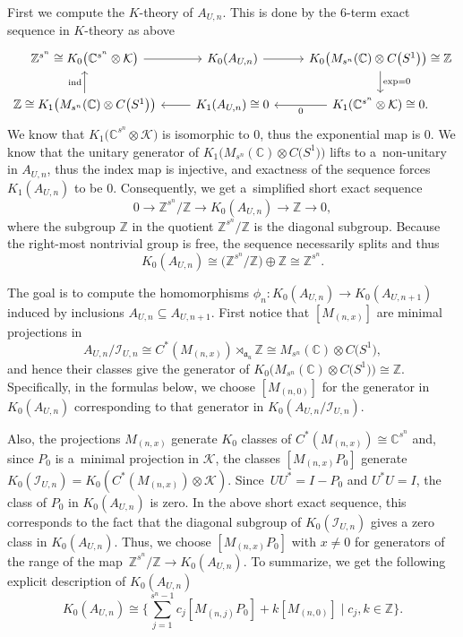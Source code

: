 \documentclass[10pt,a4paper]{amsart}
\newcommand{\C}{{\mathbb C}}
\newcommand{\Z}{{\mathbb Z}}
\newcommand{\kcal}{{\mathcal K}}
\newcommand{\fancyI}{\mathcal{I}}
\numberwithin{equation}{section}
\begin{document}
First we compute the $K$-theory of $A_{U,n}$. This is done by the 6-term exact sequence in $K$-theory as above
\begin{equation*}
\begin{tikzcd}
\Z^{s^n} \cong K_0\bigl(\C^{s^n} \otimes \kcal\bigr) \arrow[r] & K_0(A_{U,n}) \arrow[r] & K_0\bigl(M_{s^n}(\C)\otimes C\bigl(S^1\bigr)\bigr) \cong \Z \arrow{d}{\textup{exp}=0} \\
 \Z \cong K_1\bigl(M_{s^n}(\C)\otimes C\bigl(S^1\bigr)\bigr) \arrow{u}{\textup{ind}} & K_1(A_{U,n})\cong0 \arrow[l] & K_1(\C^{s^n} \otimes \kcal)\cong0 \arrow[l,"0"].
\end{tikzcd}
\end{equation*}
We know that $K_1\bigl(\C^{s^n}\otimes \kcal\bigr)$ is isomorphic to 0, thus the exponential map is 0. We know that the unitary generator of $K_1\bigl(M_{s^n}(\C) \otimes C\bigl(S^1\bigr)\bigr)$ lifts to a~non-unitary in $A_{U,n}$, thus the index map is injective, and exactness of the sequence forces $K_1(A_{U,n})$ to be 0.
Consequently, we get a~simplified short exact sequence
\begin{equation*}
0\to \Z^{s^n}/\Z \to K_0(A_{U,n}) \to \Z \to 0,
\end{equation*}
where the subgroup $\Z$ in the quotient $\Z^{s^n}/\Z$ is the diagonal subgroup. Because the right-most nontrivial group is free, the sequence necessarily splits and thus
\begin{equation*}
K_0(A_{U,n})\cong \bigl(\Z^{s^n}/\Z\bigr) \oplus \Z \cong \Z^{s^n}.
\end{equation*}

The goal is to compute the homomorphisms $\phi_n \colon K_0(A_{U,n}) \to K_0(A_{U,n+1})$ induced by inclusions $A_{U,n}\subseteq A_{U,n+1}$. First notice that $[M_{(n,x)}]$ are minimal projections in
\begin{equation*}
A_{U,n}/\fancyI_{U,n}\cong C^*(M_{(n,x)})\rtimes_{\mathfrak{a}_u} \Z\cong M_{s^n}(\C)\otimes C\bigl(S^1\bigr),
\end{equation*}
and hence their classes give the generator of $K_0\bigl(M_{s^n}(\C)\otimes C\bigl(S^1\bigr)\bigr) \cong \Z$. Specifically, in the formulas below, we choose $[M_{(n,0)}]$ for the generator in $K_0(A_{U,n})$ corresponding to that generator in $K_0(A_{U,n}/\fancyI_{U,n})$.

Also, the projections $M_{(n,x)}$ generate $K_0$ classes of $C^*(M_{(n,x)}) \cong \C^{s^n}$ and, since $P_0$ is a~minimal projection in $\kcal$, the classes $[M_{(n,x)}P_0]$ generate $K_0(\fancyI_{U,n})=K_0(C^*(M_{(n,x)})\otimes \kcal)$. Since~${UU^*=I-P_0}$ and $U^*U=I$, the class of $P_0$ in $K_0(A_{U,n})$ is zero. In the above short exact sequence, this corresponds to the fact that the diagonal subgroup of $K_0(\fancyI_{U,n})$ gives a zero class in $K_0(A_{U,n})$. Thus, we choose $[M_{(n,x)}P_0]$ with $x\ne 0$ for generators of the range of the map~${ \Z^{s^n}/\Z \to K_0(A_{U,n})}$. To summarize, we get the following explicit description of $K_0(A_{U,n})$
\begin{equation}\label{star}
K_0(A_{U,n}) \cong \Biggl\{\sum_{j=1}^{s^n-1} c_j[M_{(n,j)}P_0] + k[M_{(n,0)}] \mid c_j,k\in \Z \Biggr\}.
\end{equation}
\end{document}
